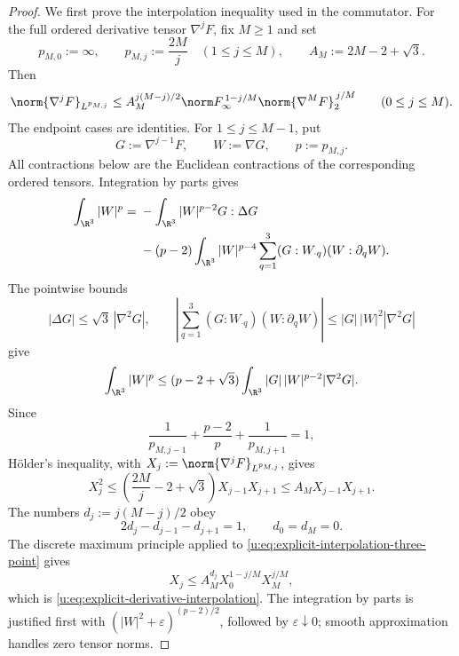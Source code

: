 \begin{proof}
We first prove the interpolation inequality used in the commutator.  For the
full ordered derivative tensor \(\nabla^jF\), fix \(M\ge1\) and set
\[
 p_{M,0}:=\infty,
 \qquad
 p_{M,j}:=\frac{2M}{j}\quad(1\le j\le M),
 \qquad
 A_M:=2M-2+\sqrt3.
\]
Then
\begin{equation}
 \norm{\nabla^jF}_{L^{p_{M,j}}}
 \le A_M^{j(M-j)/2}
 \norm F_\infty^{\,1-j/M}
 \norm{\nabla^MF}_2^{\,j/M}
 \qquad(0\le j\le M).
 \label{u:eq:explicit-derivative-interpolation}
\end{equation}
The endpoint cases are identities.  For \(1\le j\le M-1\), put
\[
 G:=\nabla^{j-1}F,
 \qquad W:=\nabla G,
 \qquad p:=p_{M,j}.
\]
All contractions below are the Euclidean contractions of the corresponding
ordered tensors.  Integration by parts gives
\begin{align*}
 \int_{\R^3}|W|^p
 ={}&-\int_{\R^3}|W|^{p-2}G:\Delta G\\
 &-(p-2)\int_{\R^3}|W|^{p-4}
   \sum_{q=1}^3(G:W_{\cdot q})(W:\partial_qW).
\end{align*}
The pointwise bounds
\[
 |\Delta G|\le\sqrt3\,|\nabla^2G|,
 \qquad
 \left|\sum_{q=1}^3(G:W_{\cdot q})(W:\partial_qW)\right|
 \le |G|\,|W|^2|\nabla^2G|
\]
give
\[
 \int_{\R^3}|W|^p
 \le(p-2+\sqrt3)
 \int_{\R^3}|G|\,|W|^{p-2}|\nabla^2G|.
\]
Since
\[
 \frac1{p_{M,j-1}}+\frac{p-2}{p}
 +\frac1{p_{M,j+1}}=1,
\]
H\"older's inequality, with
\(
 X_j:=\norm{\nabla^jF}_{L^{p_{M,j}}}
\), gives
\begin{equation}
 X_j^2
 \le\left(\frac{2M}{j}-2+\sqrt3\right)X_{j-1}X_{j+1}
 \le A_MX_{j-1}X_{j+1}.
 \label{u:eq:explicit-interpolation-three-point}
\end{equation}
The numbers \(d_j:=j(M-j)/2\) obey
\[
 2d_j-d_{j-1}-d_{j+1}=1,
 \qquad d_0=d_M=0.
\]
The discrete maximum principle applied to
\eqref{u:eq:explicit-interpolation-three-point} gives
\[
 X_j\le A_M^{d_j}X_0^{1-j/M}X_M^{j/M},
\]
which is \eqref{u:eq:explicit-derivative-interpolation}.  The integration by
parts is justified first with
\((|W|^2+\varepsilon)^{(p-2)/2}\), followed by
\(\varepsilon\downarrow0\); smooth approximation handles zero tensor norms.


\end{proof}

